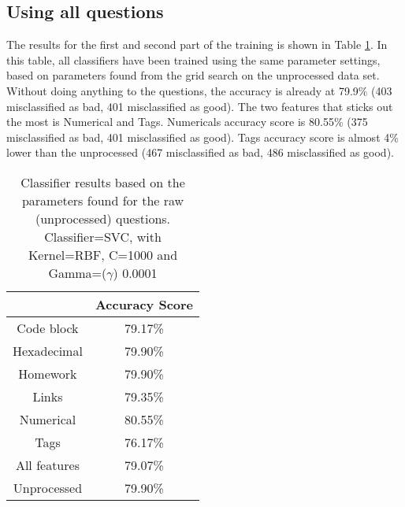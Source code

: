 \subsection{Using all questions}
\label{sec:comparison_all_questions_unprocessed}
The results for the first and second part of the training is shown in Table \ref{tab:singular_feature_detector_so}.
In this table, all classifiers have been trained using the same parameter settings, based on parameters found from the grid search on the unprocessed data set.
Without doing anything to the questions, the accuracy is already at 79.9\% (403 misclassified as bad, 401 misclassified as good).
The two features that sticks out the most is Numerical and Tags. 
Numericals accuracy score is 80.55\% (375 misclassified as bad, 401 misclassified as good).
Tags accuracy score is almost 4\% lower than the unprocessed (467 misclassified as bad, 486 misclassified as good).
\begin{table}[!h]%
	\centering
	\begin{tabular}{| c | c |}
		\hline
		~ 				& Accuracy Score	\\ \hline
		Code block 		& 79.17\%			\\ \hline
		Hexadecimal		& 79.90\%			\\ \hline
		Homework 		& 79.90\%			\\ \hline
		Links			& 79.35\%			\\ \hline				
		Numerical		& 80.55\%			\\ \hline
		Tags			& 76.17\%			\\ \hline
		All features	& 79.07\%			\\ \hline
		Unprocessed		& 79.90\%			\\ \hline
	\end{tabular}
	\caption{Classifier results based on the parameters found for the raw (unprocessed) questions. Classifier=SVC, with Kernel=RBF, C=1000 and Gamma=($\gamma$) 0.0001}	
	\label{tab:singular_feature_detector_so}
\end{table}




